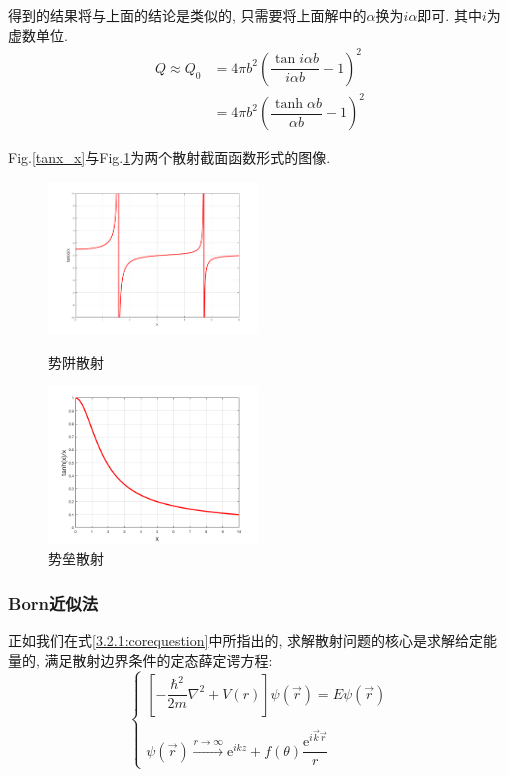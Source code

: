 \documentclass[a4paper, 11pt]{article}
\begin{document}
\begin{spacing}{1.2}
          得到的结果将与上面的结论是类似的, 只需要将上面解中的$\alpha$换为$i\alpha$即可. 其中$i$为虚数单位. 
          \begin{equation}
            \begin{aligned}
              Q \approx Q_0 &= 4\pi{}b^2\left(\dfrac{\tan{}i\alpha{}b}{i\alpha{}b}-1\right)^2\\
              &= 4\pi{}b^2\left(\dfrac{\tanh{}\alpha{}b}{\alpha{}b}-1\right)^2
            \end{aligned}
          \end{equation}

          Fig.\ref{tanx_x}与Fig.\ref{tanhx_x}为两个散射截面函数形式的图像. 

          \begin{figure}
            \begin{minipage}[t]{0.5\linewidth}
            \centering
            \includegraphics[width=2.2in]{image/tanx_x}
            \caption{势阱散射}
            \label{tanx_x}
            \end{minipage}%
            \begin{minipage}[t]{0.5\linewidth}
            \centering
            \includegraphics[width=2.2in]{image/tanhx_x}
            \caption{势垒散射}
            \label{tanhx_x}
            \end{minipage}
          \end{figure}

        \subsubsection{Born近似法}
          正如我们在式\eqref{3.2.1:corequestion}中所指出的, 求解散射问题的核心是求解给定能
          量的, 满足散射边界条件的定态薛定谔方程: 
          \begin{equation*}
            \left\{
              \begin{array}{l}
              \left[-\dfrac{\hbar^2}{2m}\nabla^2+V(r)\right]\psi(\vec{r}) = E\psi(\vec{r})\\ \ \\
              \psi(\vec{r}) \overset{r\to\infty}{\longrightarrow}\mathrm{e}^{ikz} + f(\theta)\dfrac{\mathrm{e}^{i\vec{k}\vec{r}}}{r}
              \end{array} \right. 
          \end{equation*}
          

\end{spacing}
\end{document}

